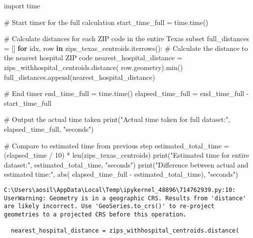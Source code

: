 \documentclass[
  letterpaper,
  DIV=11,
  numbers=noendperiod]{scrartcl}
\newenvironment{Shaded}{\begin{snugshade}}{\end{snugshade}}
\newcommand{\BuiltInTok}[1]{\textcolor[rgb]{0.00,0.23,0.31}{#1}}
\newcommand{\CommentTok}[1]{\textcolor[rgb]{0.37,0.37,0.37}{#1}}
\newcommand{\ControlFlowTok}[1]{\textcolor[rgb]{0.00,0.23,0.31}{\textbf{#1}}}
\newcommand{\DecValTok}[1]{\textcolor[rgb]{0.68,0.00,0.00}{#1}}
\newcommand{\ImportTok}[1]{\textcolor[rgb]{0.00,0.46,0.62}{#1}}
\newcommand{\KeywordTok}[1]{\textcolor[rgb]{0.00,0.23,0.31}{\textbf{#1}}}
\newcommand{\NormalTok}[1]{\textcolor[rgb]{0.00,0.23,0.31}{#1}}
\newcommand{\OperatorTok}[1]{\textcolor[rgb]{0.37,0.37,0.37}{#1}}
\newcommand{\StringTok}[1]{\textcolor[rgb]{0.13,0.47,0.30}{#1}}
\begin{document}
\begin{Shaded}
\begin{Highlighting}[]
\ImportTok{import}\NormalTok{ time}

\CommentTok{\# Start timer for the full calculation}
\NormalTok{start\_time\_full }\OperatorTok{=}\NormalTok{ time.time()}

\CommentTok{\# Calculate distances for each ZIP code in the entire Texas subset}
\NormalTok{full\_distances }\OperatorTok{=}\NormalTok{ []}
\ControlFlowTok{for}\NormalTok{ idx, row }\KeywordTok{in}\NormalTok{ zips\_texas\_centroids.iterrows():}
    \CommentTok{\# Calculate the distance to the nearest hospital ZIP code}
\NormalTok{    nearest\_hospital\_distance }\OperatorTok{=}\NormalTok{ zips\_withhospital\_centroids.distance(}
\NormalTok{        row.geometry).}\BuiltInTok{min}\NormalTok{()}
\NormalTok{    full\_distances.append(nearest\_hospital\_distance)}

\CommentTok{\# End timer}
\NormalTok{end\_time\_full }\OperatorTok{=}\NormalTok{ time.time()}
\NormalTok{elapsed\_time\_full }\OperatorTok{=}\NormalTok{ end\_time\_full }\OperatorTok{{-}}\NormalTok{ start\_time\_full}

\CommentTok{\# Output the actual time taken}
\BuiltInTok{print}\NormalTok{(}\StringTok{"Actual time taken for full dataset:"}\NormalTok{, elapsed\_time\_full, }\StringTok{"seconds"}\NormalTok{)}

\CommentTok{\# Compare to estimated time from previous step}
\NormalTok{estimated\_total\_time }\OperatorTok{=}\NormalTok{ (elapsed\_time }\OperatorTok{/} \DecValTok{10}\NormalTok{) }\OperatorTok{*} \BuiltInTok{len}\NormalTok{(zips\_texas\_centroids)}
\BuiltInTok{print}\NormalTok{(}\StringTok{"Estimated time for entire dataset:"}\NormalTok{, estimated\_total\_time, }\StringTok{"seconds"}\NormalTok{)}
\BuiltInTok{print}\NormalTok{(}\StringTok{"Difference between actual and estimated time:"}\NormalTok{, }\BuiltInTok{abs}\NormalTok{(}
\NormalTok{    elapsed\_time\_full }\OperatorTok{{-}}\NormalTok{ estimated\_total\_time), }\StringTok{"seconds"}\NormalTok{)}
\end{Highlighting}
\end{Shaded}

\begin{verbatim}
C:\Users\aosil\AppData\Local\Temp\ipykernel_48896\714762939.py:10: UserWarning: Geometry is in a geographic CRS. Results from 'distance' are likely incorrect. Use 'GeoSeries.to_crs()' to re-project geometries to a projected CRS before this operation.

  nearest_hospital_distance = zips_withhospital_centroids.distance(
\end{verbatim}
\end{document}
